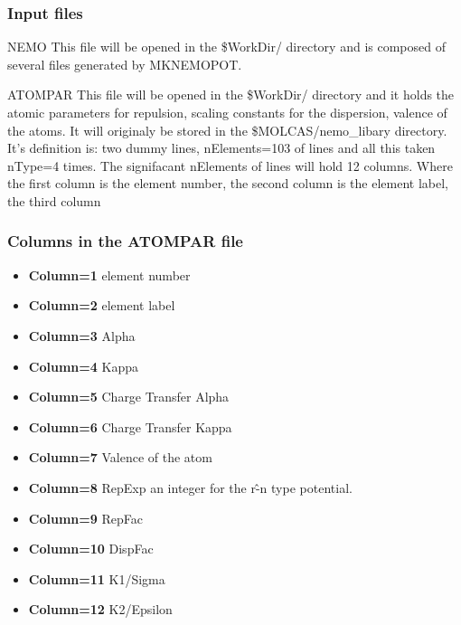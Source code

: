 \subsubsection{Input files}
\begin{filelist}
\item[NEMO]
This file will be opened in the \$WorkDir/ directory and is composed of several  files
generated by {\prgmfont MKNEMOPOT}.
\item[ATOMPAR]
This file will be opened in the \$WorkDir/ directory and it holds the atomic parameters for repulsion, scaling constants for the
dispersion, valence of the atoms. It will originaly be stored in the \$MOLCAS/nemo\_libary directory. It's definition is:
two dummy lines, nElements=103 of lines and all this taken nType=4 times. The signifacant nElements of lines will hold 12 columns.
Where the first column is the element number, the second column is the element label, the third column
\subsubsection{Columns in the ATOMPAR file}
\begin{itemize}
\itemsep 9pt plus 3pt minus 3pt
\item
{\bf Column=1}
element number
\item
{\bf Column=2}
element label
\item
{\bf Column=3}
Alpha
\item
{\bf Column=4}
Kappa
\item
{\bf Column=5}
Charge Transfer Alpha
\item
{\bf Column=6}
Charge Transfer Kappa
\item
{\bf Column=7}
Valence of the atom
\item
{\bf Column=8}
RepExp an integer for the r\^-n type potential.
\item
{\bf Column=9}
RepFac
\item
{\bf Column=10}
DispFac
\item
{\bf Column=11}
K1/Sigma
\item
{\bf Column=12}
K2/Epsilon
\end{itemize}
\end{filelist}

